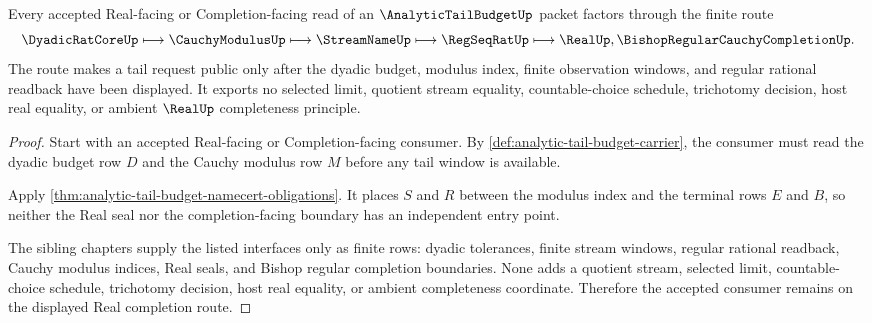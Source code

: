 \begin{theorem}
\label{thm:analytic-tail-budget-real-completion-route}
Every accepted Real-facing or Completion-facing read of an $\AnalyticTailBudgetUp$ packet factors through the finite route
$$
\DyadicRatCoreUp \longmapsto \CauchyModulusUp \longmapsto \StreamNameUp \longmapsto \RegSeqRatUp \longmapsto \RealUp,\BishopRegularCauchyCompletionUp .
$$
The route makes a tail request public only after the dyadic budget, modulus index, finite observation windows, and regular rational readback have been displayed. It exports no selected limit, quotient stream equality, countable-choice schedule, trichotomy decision, host real equality, or ambient $\RealUp$ completeness principle.
\end{theorem}
\begin{proof}
Start with an accepted Real-facing or Completion-facing consumer. By \autoref{def:analytic-tail-budget-carrier}, the consumer must read the dyadic budget row $D$ and the Cauchy modulus row $M$ before any tail window is available.

Apply \autoref{thm:analytic-tail-budget-namecert-obligations}. It places $S$ and $R$ between the modulus index and the terminal rows $E$ and $B$, so neither the Real seal nor the completion-facing boundary has an independent entry point.

The sibling chapters supply the listed interfaces only as finite rows: dyadic tolerances, finite stream windows, regular rational readback, Cauchy modulus indices, Real seals, and Bishop regular completion boundaries. None adds a quotient stream, selected limit, countable-choice schedule, trichotomy decision, host real equality, or ambient completeness coordinate. Therefore the accepted consumer remains on the displayed Real completion route.
\end{proof}



